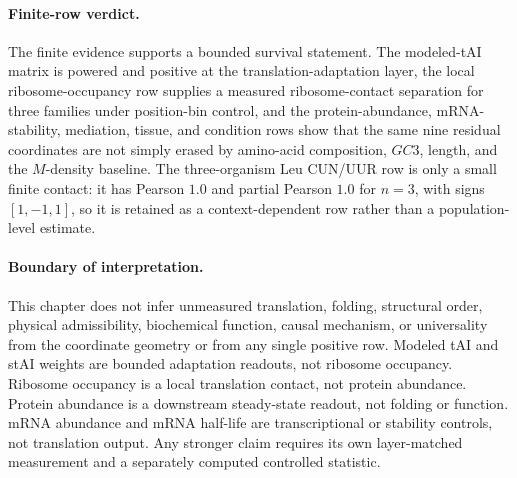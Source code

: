 \paragraph{Finite-row verdict.}
The finite evidence supports a bounded survival statement.  The modeled-tAI matrix is powered and positive at the translation-adaptation layer, the local ribosome-occupancy row supplies a measured ribosome-contact separation for three families under position-bin control, and the protein-abundance, mRNA-stability, mediation, tissue, and condition rows show that the same nine residual coordinates are not simply erased by amino-acid composition, $GC3$, length, and the $M$-density baseline.  The three-organism Leu CUN/UUR row is only a small finite contact: it has Pearson $1.0$ and partial Pearson $1.0$ for $n=3$, with signs $[1,-1,1]$, so it is retained as a context-dependent row rather than a population-level estimate.

\paragraph{Boundary of interpretation.}
This chapter does not infer unmeasured translation, folding, structural order, physical admissibility, biochemical function, causal mechanism, or universality from the coordinate geometry or from any single positive row.  Modeled tAI and stAI weights are bounded adaptation readouts, not ribosome occupancy.  Ribosome occupancy is a local translation contact, not protein abundance.  Protein abundance is a downstream steady-state readout, not folding or function.  mRNA abundance and mRNA half-life are transcriptional or stability controls, not translation output.  Any stronger claim requires its own layer-matched measurement and a separately computed controlled statistic.
